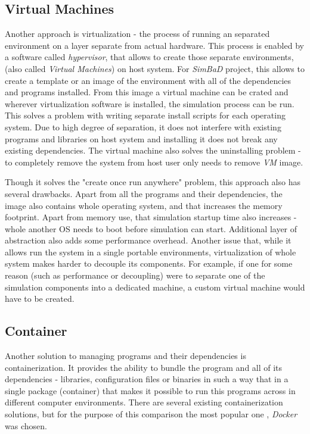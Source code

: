\subsection{Virtual Machines}
Another approach is virtualization - the process of running an separated environment on a layer separate from actual hardware. This process is enabled by a software called \textit{hypervisor}, that allows to create those separate environments, (also called \textit{Virtual Machines}) on host system. For \textit{SimBaD} project, this allows to create a template or an image of the environment with all of the dependencies and programs installed. From this image a virtual machine can be crated and wherever virtualization software is installed, the simulation process can be run. This solves a problem with writing separate install scripts for each operating system. Due to high degree of separation, it does not interfere with existing programs and libraries on host system and installing it does not break any existing dependencies. The virtual machine also solves the uninstalling problem - to completely remove the system from host user only needs to remove \textit{VM} image. 

Though it solves the "create once run anywhere" problem, this approach also has several drawbacks. Apart from all the programs and their dependencies, the image also contains whole operating system, and that increases the memory footprint. Apart from memory use, that simulation startup time also increases - whole another OS needs to boot before simulation can start. Additional layer of abstraction also adds some performance overhead. Another issue that, while it allows run the system in a single portable environments, virtualization of whole system makes harder to decouple its components. For example, if one for some reason (such as performance or decoupling) were to separate one of the simulation components into a dedicated machine, a custom virtual machine would have to be created. 
\subsection{Container}
Another solution to managing programs and their dependencies is containerization. It provides the ability to bundle the program and all of its dependencies - libraries, configuration files or binaries in such a way that in a single package (container) that makes it possible to run this programs across in different computer environments. There are several existing containerization solutions, but for the purpose of this comparison the most popular one \cite{Diamanti2018}, \textit{Docker} was chosen.

